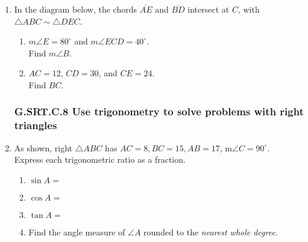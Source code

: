 \documentclass[12pt, twoside]{article}
\begin{document}
\begin{enumerate}[itemsep=0.5cm]
\item In the diagram below, the chords $\overline{AE}$ and $\overline{BD}$ intersect at $C$, with $\triangle ABC \sim \triangle DEC$.
\begin{multicols}{2}
  \begin{enumerate}

    \item $m\angle E = 80^\circ$ and $m\angle ECD = 40^\circ$.\\ 
    Find  $m\angle B$.
    \item $AC=12$, $CD=30$, and $CE=24$.\\ 
    Find $BC$. 
  \end{enumerate}

    \begin{center}
\end{center} \vspace{2cm}
\end{multicols} 

\newpage
\subsubsection*{G.SRT.C.8 Use trigonometry to solve problems with right triangles}
\item As shown, right $\triangle ABC$ has $AC=8, BC=15, AB=17$, m$\angle C=90^\circ$. \\[0.25cm] 
Express each trigonometric ratio as a fraction.
  \begin{multicols}{2}
    \begin{enumerate}
      \item $\sin A =$
      \item $\cos A =$
      \item $\tan A =$ 
      \item Find the angle measure of $\angle A$ rounded to the \emph{nearest whole degree}. \vspace{1cm}
    \end{enumerate}
    \begin{center}
    \end{center}
  \end{multicols}\vspace{0.25cm}


\end{enumerate}
\end{document}
